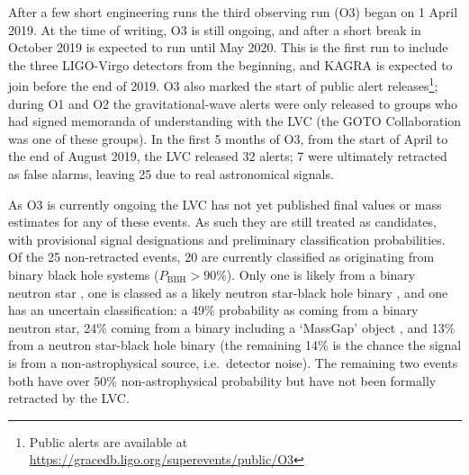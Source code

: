 \begin{colsection}
After a few short engineering runs the third observing run (O3)  began on 1 April 2019. At the time of writing, O3 is still ongoing, and after a short break in October 2019 is expected to run until May 2020. This is the first run to include the three LIGO-Virgo detectors from the beginning, and KAGRA is expected to join before the end of 2019. O3 also marked the start of public alert releases\footnote{Public alerts are available at \url{https://gracedb.ligo.org/superevents/public/O3}}; during O1 and O2 the gravitational-wave alerts were only released to groups who had signed memoranda of understanding with the LVC (the GOTO Collaboration was one of these groups). In the first 5 months of O3, from the start of April to the end of August 2019, the LVC released 32 alerts; 7 were ultimately retracted as false alarms, leaving 25 due to real astronomical signals.

\newpage

As O3 is currently ongoing the LVC has not yet published final values or mass estimates for any of these events. As such they are still treated as candidates, with provisional signal designations and preliminary classification probabilities. Of the 25 non-retracted events, 20 are currently classified as originating from binary black hole systems ($P_\text{BBH}>90\%$). Only one is likely from a binary neutron star \citep[S190425z;][]{S190425z}, one is classed as a likely neutron star-black hole binary \citep[S190814bv;][]{S190814bv}, and one \citep[S190426c;][]{S190426c} has an uncertain classification: a 49\% probability as coming from a binary neutron star, 24\% coming from a binary including a `MassGap' object \citep[a theorised object with a mass between a neutron star and a black hole;][]{GW_MassGap}, and 13\% from a neutron star-black hole binary (the remaining 14\% is the chance the signal is from a non-astrophysical source, i.e.\ detector noise). The remaining two events both have over 50\% non-astrophysical probability but have not been formally retracted by the LVC.\@

\end{colsection}


